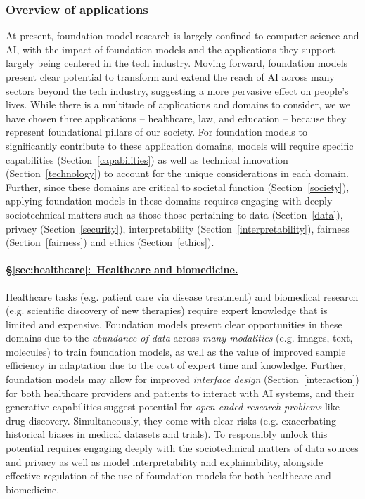 \subsubsection{Overview of applications}
\label{sec:overview-applications}

At present, foundation model research is largely confined to computer science and AI, with the impact of foundation models and the applications they support largely being centered in the tech industry. Moving forward, foundation models present clear potential to transform and extend the reach of AI across many sectors beyond the tech industry, suggesting a more pervasive effect on people's lives. While there is a multitude of applications and domains to consider, we we have chosen three applications -- healthcare, law, and education -- because they represent foundational pillars of our society. For foundation models to significantly contribute to these application domains, models will require specific capabilities (Section~\ref{capabilities}) as well as technical innovation (Section~\ref{technology}) to account for the unique considerations in each domain. Further, since these domains are critical to societal function (Section~\ref{society}), applying foundation models in these domains requires engaging with deeply sociotechnical matters such as those those pertaining to data (Section~\ref{data}), privacy (Section~\ref{security}), interpretability (Section~\ref{interpretability}),  fairness (Section~\ref{fairness}) and ethics (Section~\ref{ethics}).

\paragraph{\hyperref[sec:healthcare]{§\ref{sec:healthcare}:~Healthcare and biomedicine.}}

Healthcare tasks (e.g. patient care via disease treatment) and biomedical research (e.g. scientific discovery of new therapies) require expert knowledge that is limited and expensive. Foundation models present clear opportunities in these domains due to the \textit{abundance of data} across \textit{many modalities} (e.g. images, text, molecules) to train foundation models, as well as the value of improved sample efficiency in adaptation due to the cost of expert time and knowledge. Further, foundation models may allow for improved \textit{interface design} (Section~\ref{interaction}) for both healthcare providers and patients to interact with AI systems, and their generative capabilities suggest potential for \textit{open-ended research problems} like drug discovery. Simultaneously, they come with clear risks (e.g. exacerbating historical biases in medical datasets and trials). To responsibly unlock this potential requires engaging deeply with the sociotechnical matters of data sources and privacy as well as model interpretability and explainability, alongside effective regulation of the use of foundation models for both healthcare and biomedicine.

